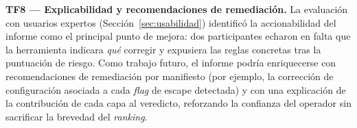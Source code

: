 \textbf{TF8 — Explicabilidad y recomendaciones de remediación.} La evaluación
con usuarios expertos (Sección~\ref{sec:usabilidad}) identificó la accionabilidad
del informe como el principal punto de mejora: dos participantes echaron en falta
que la herramienta indicara \textit{qué} corregir y expusiera las reglas concretas
tras la puntuación de riesgo. Como trabajo futuro, el informe podría enriquecerse
con recomendaciones de remediación por manifiesto (por ejemplo, la corrección de
configuración asociada a cada \textit{flag} de escape detectada) y con una
explicación de la contribución de cada capa al veredicto, reforzando la confianza
del operador sin sacrificar la brevedad del \textit{ranking}.
